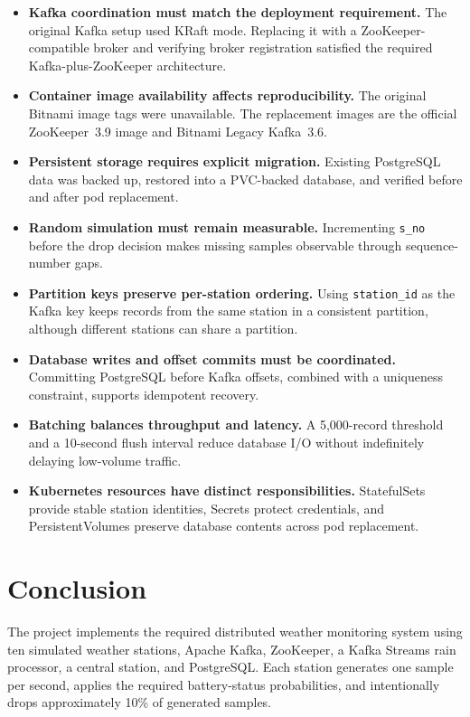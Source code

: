 \documentclass[12pt,a4paper]{article}
\begin{document}
\begin{itemize}
    \item \textbf{Kafka coordination must match the deployment requirement.} The original Kafka setup used KRaft mode. Replacing it with a ZooKeeper-compatible broker and verifying broker registration satisfied the required Kafka-plus-ZooKeeper architecture.

    \item \textbf{Container image availability affects reproducibility.} The original Bitnami image tags were unavailable. The replacement images are the official ZooKeeper~3.9 image and Bitnami Legacy Kafka~3.6.

    \item \textbf{Persistent storage requires explicit migration.} Existing PostgreSQL data was backed up, restored into a PVC-backed database, and verified before and after pod replacement.

    \item \textbf{Random simulation must remain measurable.} Incrementing \texttt{s\_no} before the drop decision makes missing samples observable through sequence-number gaps.

    \item \textbf{Partition keys preserve per-station ordering.} Using \texttt{station\_id} as the Kafka key keeps records from the same station in a consistent partition, although different stations can share a partition.

    \item \textbf{Database writes and offset commits must be coordinated.} Committing PostgreSQL before Kafka offsets, combined with a uniqueness constraint, supports idempotent recovery.

    \item \textbf{Batching balances throughput and latency.} A 5,000-record threshold and a 10-second flush interval reduce database I/O without indefinitely delaying low-volume traffic.

    \item \textbf{Kubernetes resources have distinct responsibilities.} StatefulSets provide stable station identities, Secrets protect credentials, and PersistentVolumes preserve database contents across pod replacement.
\end{itemize}

\section{Conclusion}
The project implements the required distributed weather monitoring system using ten simulated weather stations, Apache Kafka, ZooKeeper, a Kafka Streams rain processor, a central station, and PostgreSQL. Each station generates one sample per second, applies the required battery-status probabilities, and intentionally drops approximately 10\% of generated samples.
\end{document}
